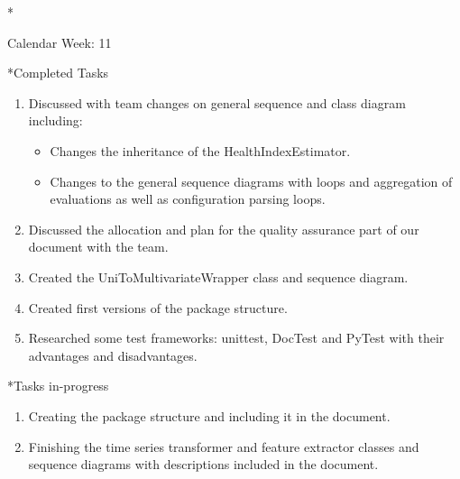 \documentclass[11pt,a4paper]{article}
\begin{document}
\newpage
\begin{section}*{Calendar Week: 11 \hfill \date{19 March, 2021}}
	
	\begin{subsection}*{Completed Tasks}
		\begin{enumerate}
			\item Discussed with team changes on general sequence and class diagram including:
			\begin{itemize}
				\item Changes the inheritance of the HealthIndexEstimator.
				\item Changes to the general sequence diagrams with loops and aggregation of evaluations as well as configuration parsing loops.
			\end{itemize}
			\item Discussed the allocation and plan for the quality assurance part of our document with the team.
			\item Created the UniToMultivariateWrapper class and sequence diagram.
			\item Created first versions of the package structure.
			\item Researched some test frameworks: unittest, DocTest and PyTest with their advantages and disadvantages.
		\end{enumerate}
	\end{subsection}
	
	\begin{subsection}*{Tasks in-progress}
		\begin{enumerate}
			\item Creating the package structure and including it in the document.
			\item Finishing the time series transformer and feature extractor classes and sequence diagrams with descriptions included in the document.
		\end{enumerate}
	\end{subsection}
	
\end{section}
\end{document}
